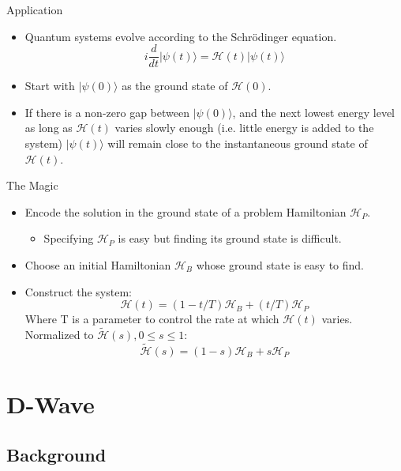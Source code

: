 \documentclass{beamer}
\begin{document}
\begin{frame}{Application}

  \begin{itemize}
    \item Quantum systems evolve according to the Schr\"{o}dinger equation.
     \[ i \frac{d}{dt} |\psi(t)\rangle = \mathcal{H}(t)|\psi(t)\rangle\]
    \pause
   \item Start with \(|\psi(0)\rangle\) as the ground state of \(\mathcal{H}(0)\).
    \pause
   \item If there is a non-zero gap between \(|\psi(0)\rangle\), and the next lowest energy level as long as \(\mathcal{H}(t)\) varies slowly enough (i.e. little energy is added to the system) \(|\psi(t)\rangle\) will remain close to the instantaneous ground state of \(\mathcal{H}(t)\).
  \end{itemize}

\end{frame}

\begin{frame}{The Magic}
\pause
  \begin{itemize}
   \item Encode the solution in the ground state of a problem Hamiltonian \(\mathcal{H}_P\).
    \begin{itemize}
     \item Specifying \(\mathcal{H}_P\) is easy but finding its ground state is difficult.
    \end{itemize}
    \pause
   \item Choose an initial Hamiltonian \(\mathcal{H}_B\) whose ground state is easy to find.
    \pause
   \item Construct the system: \[\mathcal{H}(t) = (1-t/T)\mathcal{H}_B + (t/T)\mathcal{H}_P\] Where T is a parameter to control the rate at which \(\mathcal{H}(t)\) varies.  Normalized to \(\tilde{\mathcal{H}}(s), 0 \leq s\leq 1\): \[\tilde{\mathcal{H}}(s) = (1-s)\mathcal{H}_B + s\mathcal{H}_P\]

  \end{itemize}

\end{frame}

\section{D-Wave}

\subsection{Background}
\end{document}
